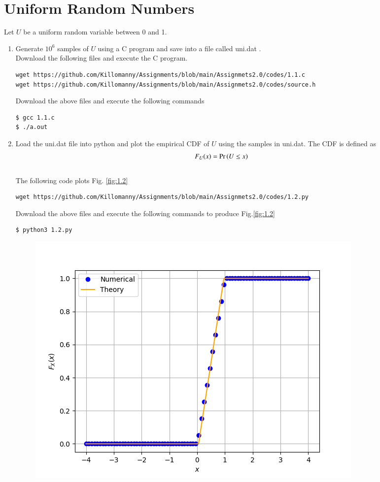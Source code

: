 \documentclass[journal,12pt,twocolumn]{IEEEtran}
\renewcommand\thesection{\arabic{section}}
\begin{document}
\section{Uniform Random Numbers}
Let $U$ be a uniform random variable between 0 and 1.
\begin{enumerate}[label=\thesection.\arabic*
,ref=\thesection.\theenumi]
\item Generate $10^6$ samples of $U$ using a C program and save into a file called uni.dat .
\\
\solution Download the following files and execute the  C program.
\begin{lstlisting}
wget https://github.com/Killomanny/Assignments/blob/main/Assignmets2.0/codes/1.1.c
wget https://github.com/Killomanny/Assignments/blob/main/Assignmets2.0/codes/source.h
\end{lstlisting}
Download the above files and execute the following commands
\begin{lstlisting}
$ gcc 1.1.c
$ ./a.out
\end{lstlisting}
\item
Load the uni.dat file into python and plot the empirical CDF of $U$ using the samples in uni.dat. The CDF is defined as
\begin{align}
F_{U}(x) = \Pr\left(U \le x\right)
\end{align}
\\
\solution  The following code plots Fig. \ref{fig:1.2}
\begin{lstlisting}
wget https://github.com/Killomanny/Assignments/blob/main/Assignmets2.0/codes/1.2.py
\end{lstlisting}
Download the above files and execute the following commands to produce Fig.\ref{fig:1.2}
\begin{lstlisting}
$ python3 1.2.py
\end{lstlisting}
\begin{figure}[!h]
\centering
\includegraphics[width=\columnwidth]{./figs/1.2.png}

\end{figure}
\end{enumerate}
\end{document}
